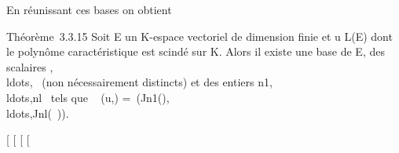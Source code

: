 En réunissant ces bases on obtient

Théorème~3.3.15 Soit E un K-espace vectoriel de dimension finie et u \in
L(E) dont le polynôme caractéristique est scindé sur K. Alors il existe
une base  de E, des scalaires
,\\ldots,\mul~
(non nécessairement distincts) et des entiers
n1,\\ldots,nl~
tels que \mathrmMat~ (u,)
=\
\mathrmdiag(Jn1(),\\ldots,Jnl(\mul~)).

{[}
{[}
{[}
{[}
